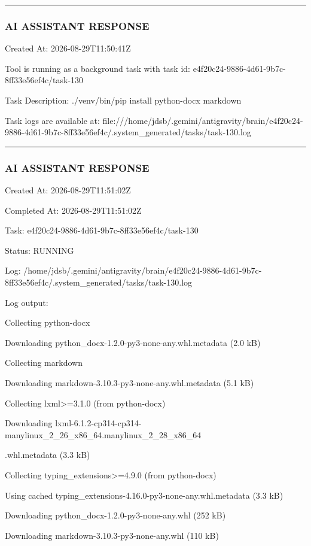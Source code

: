 \documentclass[11pt,a4paper]{article}
\begin{document}
{\hrule

\subsubsection{AI ASSISTANT RESPONSE}

Created At: 2026-08-29T11:50:41Z

Tool is running as a background task with task id: e4f20c24-9886-4d61-9b7c-8ff33e56ef4c/task-130

Task Description: ./venv/bin/pip install python-docx markdown

Task logs are available at: file:///home/jdsb/.gemini/antigravity/brain/e4f20c24-9886-4d61-9b7c-8ff33e56ef4c/.system\_generated/tasks/task-130.log


\hrule

\subsubsection{AI ASSISTANT RESPONSE}

Created At: 2026-08-29T11:51:02Z

Completed At: 2026-08-29T11:51:02Z

Task: e4f20c24-9886-4d61-9b7c-8ff33e56ef4c/task-130

Status: RUNNING

Log: /home/jdsb/.gemini/antigravity/brain/e4f20c24-9886-4d61-9b7c-8ff33e56ef4c/.system\_generated/tasks/task-130.log

Log output:

Collecting python-docx

Downloading python\_docx-1.2.0-py3-none-any.whl.metadata (2.0 kB)

Collecting markdown

Downloading markdown-3.10.3-py3-none-any.whl.metadata (5.1 kB)

Collecting lxml>=3.1.0 (from python-docx)

Downloading lxml-6.1.2-cp314-cp314-manylinux\_2\_26\_x86\_64.manylinux\_2\_28\_x86\_64

.whl.metadata (3.3 kB)

Collecting typing\_extensions>=4.9.0 (from python-docx)

Using cached typing\_extensions-4.16.0-py3-none-any.whl.metadata (3.3 kB)

Downloading python\_docx-1.2.0-py3-none-any.whl (252 kB)

Downloading markdown-3.10.3-py3-none-any.whl (110 kB)

}
\end{document}
